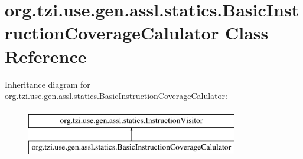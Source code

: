 \hypertarget{classorg_1_1tzi_1_1use_1_1gen_1_1assl_1_1statics_1_1_basic_instruction_coverage_calulator}{\section{org.\-tzi.\-use.\-gen.\-assl.\-statics.\-Basic\-Instruction\-Coverage\-Calulator Class Reference}
\label{classorg_1_1tzi_1_1use_1_1gen_1_1assl_1_1statics_1_1_basic_instruction_coverage_calulator}
}
Inheritance diagram for org.\-tzi.\-use.\-gen.\-assl.\-statics.\-Basic\-Instruction\-Coverage\-Calulator\-:\begin{figure}[H]
\begin{center}
\leavevmode
\includegraphics[height=2.000000cm]{classorg_1_1tzi_1_1use_1_1gen_1_1assl_1_1statics_1_1_basic_instruction_coverage_calulator}
\end{center}
\end{figure}
